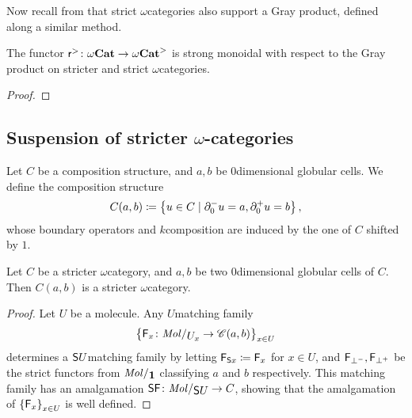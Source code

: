 

Now recall from \cite[Appendice A]{ara2020joint} that strict \( \omega \)\nbd categories also support a Gray product, defined along a similar method.

\begin{prop} \label{prop:reflection_to_stricter_monoidal}
    The functor \( \mathsf{r}^{>} \colon {\omega\mathbf{Cat}} \to {\omega\mathbf{Cat}}^> \) is strong monoidal with respect to the Gray product on stricter and strict \( \omega \)\nbd categories.
\end{prop}
\begin{proof}
\end{proof}

\subsection{Suspension of stricter \texorpdfstring{$\omega$}{ω}-categories}

\begin{dfn} 
    Let \( C \) be a composition structure, and \( a, b \) be \( 0 \)\nbd dimensional globular cells.
    We define the composition structure
    \begin{equation*}
        C(a, b) \coloneqq \left\{ {u \in C \mid \partial_{0}^{-} u = a, \partial_{0}^{+} u = b} \right\},    
    \end{equation*}
    whose boundary operators and \( k \)\nbd composition are induced by the one of \( C \) shifted by \( 1 \).
\end{dfn}

\begin{lem} \label{lem:hom_of_stricter_is_stricter}
    Let \( C \) be a stricter \( \omega \)\nbd category, and \( a, b \) be two \( 0 \)\nbd dimensional globular cells of \( C \).
    Then \( C(a, b) \) is a stricter \( \omega \)\nbd category.
\end{lem}
\begin{proof}
    Let \( U \) be a molecule.
    Any \( U \)\nbd matching family 
    \begin{equation*}
        \set{\F_x \colon \molecin{\imel{U}{x}} \to \C(a, b)}_{x \in U}
    \end{equation*}
    determines a \( \mathsf{S}{U} \)\nbd matching family 
    by letting \( \mathsf{F}_{\mathsf{S}{x}} \coloneqq \mathsf{F}_x \) for \( x \in U \), and \( \mathsf{F}_{\bot^-}, \mathsf{F}_{\bot^+} \) be the strict functors from \( \molecin{\pt} \) classifying \( a \) and \( b \) respectively. 
    This matching family has an amalgamation \( \sus{\F} \colon \molecin{\sus{U}} \to C \), showing that the amalgamation of \( \left\{ {\mathsf{F}_x} \right\}_{x \in U} \) is well defined.
\end{proof}

